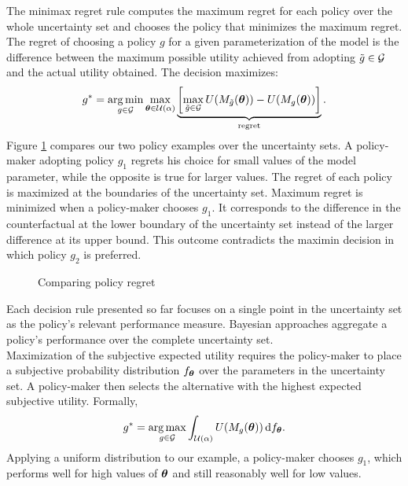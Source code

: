 \noindent The minimax regret rule \citep{Manski.2004, Niehans.1948} computes the maximum regret for each policy over the whole uncertainty set and chooses the policy that minimizes the maximum regret. The regret of choosing a policy $g$ for a given parameterization of the model is the difference between the maximum possible utility achieved from adopting $\tilde{g} \in \mathcal{G}$ and the actual utility obtained. The decision maximizes:
%
\begin{align*}
  g^* =\operatorname*{arg\,min}_{g \in \mathcal{G}} \max_{\bm{\theta} \in \mathcal{U}(\alpha)}  \underbrace{\left[\max_{\tilde{g} \in \mathcal{G}} U(M_{\tilde{g}}(\bm{\theta})) - U(M_g(\bm{\theta})) \right]}_{\text{regret}}.
\end{align*}
%
\noindent Figure \ref{Comparing policy regret} compares our two policy examples over the uncertainty sets. A policy-maker adopting policy $g_1$ regrets his choice for small values of the model parameter, while the opposite is true for larger values. The regret of each policy is maximized at the boundaries of the uncertainty set. Maximum regret is minimized when a policy-maker chooses $g_1$. It corresponds to the difference in the counterfactual at the lower boundary of the uncertainty set instead of the larger difference at its upper bound. This outcome contradicts the maximin decision in which policy $g_2$ is preferred.

\begin{figure}[h!]\centering
{}
\caption{Comparing policy regret}\label{Comparing policy regret}\vspace{0.5cm}
\end{figure}\FloatBarrier

\noindent Each decision rule presented so far focuses on a single point in the uncertainty set as the policy's relevant performance measure. Bayesian approaches aggregate a policy's performance over the complete uncertainty set.\\

\noindent Maximization of the subjective expected utility \citep{Savage.1954} requires the policy-maker to place a subjective probability distribution $f_{\bm{\theta}}$ over the parameters in the uncertainty set.  A policy-maker then selects the alternative with the highest expected subjective utility. Formally,
%
\begin{align*}
  g^* =\operatorname*{arg\,max}_{g \in \mathcal{G}} \int_{\mathcal{U}(\alpha)} U(M_g({\bm{\theta}})) \mathop{}\!\mathrm{d} f_{\bm{\theta}}.
\end{align*}
%
\noindent Applying a uniform distribution to our example, a policy-maker chooses $g_1$, which performs well for high values of $\bm{\theta}$ and still reasonably well for low values.
